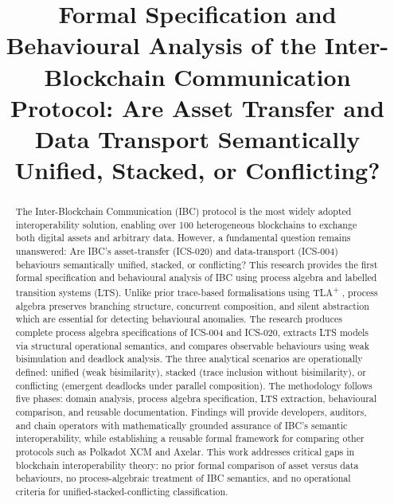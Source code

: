 \documentclass[oneside]{etd}
\title{Formal Specification and Behavioural Analysis of the Inter-Blockchain Communication Protocol: Are Asset Transfer and Data Transport Semantically Unified, Stacked, or Conflicting?}
\begin{document}
\maketitle
\makerecomm
\makeacceptance
\makedeclaration


\begin{abstract}
The Inter-Blockchain Communication (IBC) protocol is the most widely adopted interoperability solution, enabling over 100 heterogeneous blockchains to exchange both digital assets and arbitrary data. However, a fundamental question remains unanswered: Are IBC's asset-transfer (ICS-020) and data-transport (ICS-004) behaviours semantically unified, stacked, or conflicting? This research provides the first formal specification and behavioural analysis of IBC using process algebra and labelled transition systems (LTS). Unlike prior trace-based formalisations using TLA\textsuperscript{+} , process algebra preserves branching structure, concurrent composition, and silent abstraction which are essential for detecting behavioural anomalies. The research produces complete process algebra specifications of ICS-004 and ICS-020, extracts LTS models via structural operational semantics, and compares observable behaviours using weak bisimulation and deadlock analysis. The three analytical scenarios are operationally defined: unified (weak bisimilarity), stacked (trace inclusion without bisimilarity), or conflicting (emergent deadlocks under parallel composition). The methodology follows five phases: domain analysis, process algebra specification, LTS extraction, behavioural comparison, and reusable documentation. Findings will provide developers, auditors, and chain operators with mathematically grounded assurance of IBC's semantic interoperability, while establishing a reusable formal framework for comparing other protocols such as Polkadot XCM and Axelar. This work addresses critical gaps in blockchain interoperability theory: no prior formal comparison of asset versus data behaviours, no process-algebraic treatment of IBC semantics, and no operational criteria for unified-stacked-conflicting classification.
\end{abstract}



\end{document}
